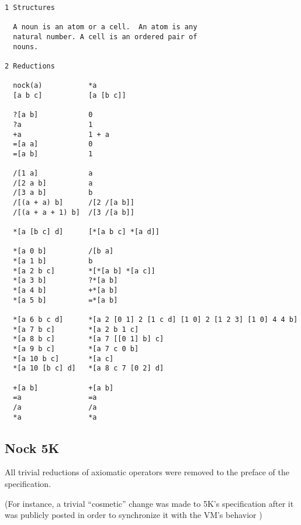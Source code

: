 \documentclass[twoside]{article}
\begin{document}
\begin{lstlisting}[label=lst:nock6k,caption={Nock 6K, 6 July 2011.},style=listingcode]
1 Structures

  A noun is an atom or a cell.  An atom is any
  natural number. A cell is an ordered pair of
  nouns.

2 Reductions

  nock(a)           *a
  [a b c]           [a [b c]]

  ?[a b]            0
  ?a                1
  +a                1 + a
  =[a a]            0
  =[a b]            1

  /[1 a]            a
  /[2 a b]          a
  /[3 a b]          b
  /[(a + a) b]      /[2 /[a b]]
  /[(a + a + 1) b]  /[3 /[a b]]

  *[a [b c] d]      [*[a b c] *[a d]]

  *[a 0 b]          /[b a]
  *[a 1 b]          b
  *[a 2 b c]        *[*[a b] *[a c]]
  *[a 3 b]          ?*[a b]
  *[a 4 b]          +*[a b]
  *[a 5 b]          =*[a b]

  *[a 6 b c d]      *[a 2 [0 1] 2 [1 c d] [1 0] 2 [1 2 3] [1 0] 4 4 b]
  *[a 7 b c]        *[a 2 b 1 c]
  *[a 8 b c]        *[a 7 [[0 1] b] c]
  *[a 9 b c]        *[a 7 c 0 b]
  *[a 10 b c]       *[a c]
  *[a 10 [b c] d]   *[a 8 c 7 [0 2] d]

  +[a b]            +[a b]
  =a                =a
  /a                /a
  *a                *a
\end{lstlisting}

\subsection{Nock 5K}

All trivial reductions of axiomatic operators were removed to the preface of the specification.

(For instance, a trivial ``cosmetic'' change was made to 5K's specification after it was publicly posted in order to synchronize it with the VM's behavior
)
\end{document}
